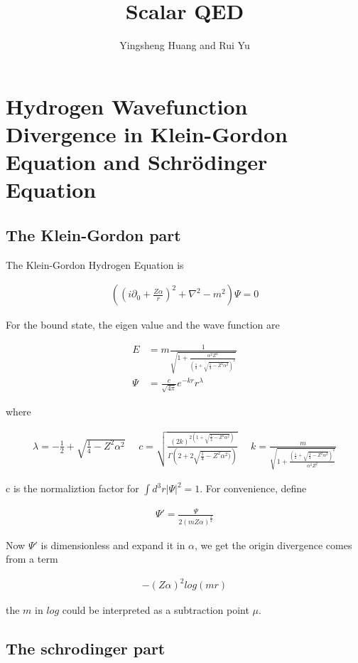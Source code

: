 \documentclass{article}
\title{Scalar QED}
\author{Yingsheng Huang and Rui Yu}
\begin{document}
\maketitle
\section{Hydrogen Wavefunction Divergence in Klein-Gordon Equation and Schr\"odinger Equation}
\subsection{The Klein-Gordon part}
The Klein-Gordon Hydrogen Equation is

\begin{align}
((i\partial_0+\frac{Z\alpha}{r})^2+\nabla^2-m^2)\Psi=0
\end{align}
 
For the bound state, the eigen value and the wave function are

\begin{align}
E&=m\frac{1}{\sqrt{1+\frac{\alpha^2 Z^2}{(\frac{1}{2}+\sqrt{\frac{1}{4}-Z^2\alpha^2})^2}}}\\
\Psi&=\frac{c}{\sqrt{4\pi}}e^{-kr}r^\lambda
\end{align}

where

\begin{align}
\lambda=-\frac{1}{2}+\sqrt{\frac{1}{4}-Z^2\alpha^2}\ \ \ \ \ \ 
c=\sqrt{\frac{(2k)^{2(1+\sqrt{\frac{1}{4}-Z^2\alpha^2})}}{\Gamma(2+2\sqrt{\frac{1}{4}-Z^2\alpha^2)})}}\ \ \ \ \ \ 
k=\frac{m}{\sqrt{1+\frac{(\frac{1}{2}+\sqrt{\frac{1}{4}-Z^2\alpha^2})^2}{\alpha^2Z^2}}}
\end{align}

c is the normaliztion factor for $\int d^3r|\Psi|^2=1$. For convenience, define

\begin{align}
\Psi '=\frac{\Psi}{2(mZ\alpha)^\frac{3}{2}}
\end{align}

Now $\Psi '$ is dimensionless and expand it in $\alpha$, we get the origin divergence comes from a term

\begin{align}
-(Z\alpha)^2log(m r)
\end{align}

the $m$ in $log$ could be interpreted as a subtraction point $\mu$.

\subsection{The schrodinger part}
\end{document}

